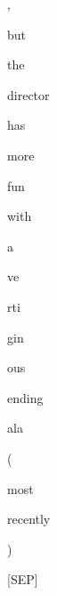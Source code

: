 \documentclass[varwidth=150mm]{standalone}
\begin{document}
\begin{CJK*}{UTF8}{gbsn}
{{{\colorbox{red!0.0}{\strut ,} \colorbox{red!8.5157470703125}{\strut but} \colorbox{red!4.049893856048584}{\strut the} \colorbox{red!7.775165557861328}{\strut director} \colorbox{red!0.0}{\strut has} \colorbox{red!0.0}{\strut more} \colorbox{red!0.0}{\strut fun} \colorbox{red!3.064539909362793}{\strut with} \colorbox{red!4.108125686645508}{\strut a} \colorbox{red!1.7121124267578125}{\strut ve}\colorbox{red!2.275822877883911}{\strut rti}\colorbox{red!2.1808276176452637}{\strut gin}\colorbox{red!3.086770534515381}{\strut ous} \colorbox{red!4.002755165100098}{\strut ending} \colorbox{red!9.658021926879883}{\strut ala} \colorbox{red!10.028440475463867}{\strut (} \colorbox{red!1.912980556488037}{\strut most} \colorbox{red!27.063716888427734}{\strut recently} \colorbox{red!24.209842681884766}{\strut )} \colorbox{red!9.1913423538208}{\strut [SEP]}
}}}
\end{CJK*}
\end{document}
